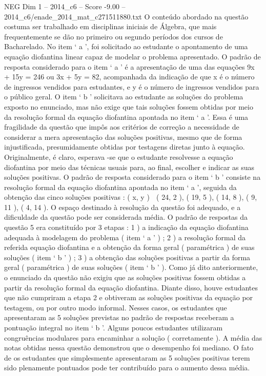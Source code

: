 \begin{textsample}{NEG Dim 1 – 2014\_c6 – Score -9.00 – 2014\_c6/enade\_2014\_mat\_c271511880.txt}
O conteúdo abordado na questão costuma ser trabalhado em disciplinas iniciais de Álgebra, que mais frequentemente se dão no primeiro ou segundo períodos dos cursos de Bacharelado.
No item ‘ a ’, foi solicitado ao estudante o apontamento de uma equação diofantina linear capaz de modelar o problema apresentado.
O padrão de resposta considerado para o item ‘ a ’ é a apresentação de uma das equações 9x + 15y = 246 ou 3x + 5y = 82, acompanhada da indicação de que x é o número de ingressos vendidos para estudantes, e y é o número de ingressos vendidos para o público geral.
O item ‘ b ’ solicitava ao estudante as soluções do problema exposto no enunciado, mas não exige que tais soluções fossem obtidas por meio da resolução formal da equação diofantina apontada no item ‘ a ’.
Essa é uma fragilidade da questão que impôs aos critérios de correção a necessidade de considerar a mera apresentação das soluções positivas, mesmo que de forma injustificada, presumidamente obtidas por testagens diretas junto à equação.
Originalmente, é claro, esperava -se que o estudante resolvesse a equação diofantina por meio das técnicas usuais para, ao final, escolher e indicar as suas soluções positivas.
O padrão de resposta considerado para o item ‘ b ’ consiste na resolução formal da equação diofantina apontada no item ‘ a ’, seguida da obtenção das cinco soluções positivas : ( x, y )  ( 24, 2 ), ( 19, 5 ), ( 14, 8 ), ( 9, 11 ), ( 4, 14 ).
O espaço destinado à resolução da questão foi adequado, e a dificuldade da questão pode ser considerada média.
O padrão de respostas da questão 5 era constituído por 3 etapas : 1 ) a indicação da equação diofantina adequada à modelagem do problema ( item ‘ a ’ ) ; 2 ) a resolução formal da referida equação diofantina e a obtenção da forma geral ( paramétrica ) de suas soluções ( item ‘ b ’ ) ; 3 ) a obtenção das soluções positivas a partir da forma geral ( paramétrica ) de suas soluções ( item ‘ b ’ ).
Como já dito anteriormente, o enunciado da questão não exigiu que as soluções positivas fossem obtidas a partir da resolução formal da equação diofantina.
Diante disso, houve estudantes que não cumpriram a etapa 2 e obtiveram as soluções positivas da equação por testagem, ou por outro modo informal.
Nesses casos, os estudantes que apresentaram as 5 soluções previstas no padrão de respostas receberam a pontuação integral no item ‘ b ’.
Alguns poucos estudantes utilizaram congruências modulares para encaminhar a solução ( corretamente ).
A média das notas obtidas nessa questão demonstrou que o desempenho foi mediano.
O fato de os estudantes que simplesmente apresentaram as 5 soluções positivas terem sido plenamente pontuados pode ter contribuído para o aumento dessa média.

\end{textsample}
